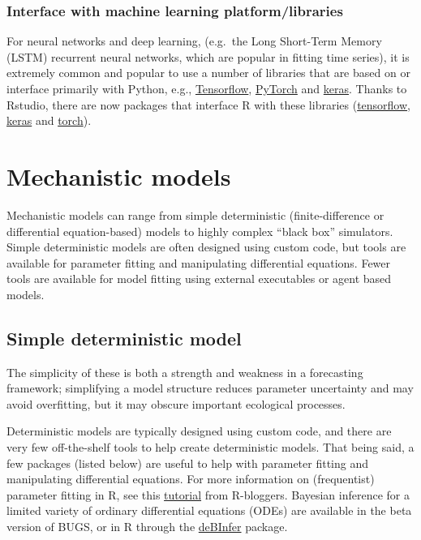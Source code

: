 \documentclass[
]{book}
\begin{document}
\hypertarget{interface-with-machine-learning-platformlibraries}{%
\subsubsection{Interface with machine learning platform/libraries}\label{interface-with-machine-learning-platformlibraries}}

For neural networks and deep learning, (e.g.~the Long Short-Term Memory (LSTM) recurrent neural networks, which are popular in fitting time series), it is extremely common and popular to use a number of libraries that are based on or interface primarily with Python, e.g., \href{https://www.tensorflow.org/}{Tensorflow}, \href{https://pytorch.org/}{PyTorch} and \href{https://keras.io/}{keras}. Thanks to Rstudio, there are now packages that interface R with these libraries (\href{https://tensorflow.rstudio.com/}{tensorflow}, \href{https://keras.rstudio.com/}{keras} and \href{https://blogs.rstudio.com/ai/posts/2020-09-29-introducing-torch-for-r/}{torch}).

\hypertarget{mechanistic-models}{%
\section{Mechanistic models}\label{mechanistic-models}}

Mechanistic models can range from simple deterministic (finite-difference or differential equation-based) models to highly complex ``black box'' simulators. Simple deterministic models are often designed using custom code, but tools are available for parameter fitting and manipulating differential equations. Fewer tools are available for model fitting using external executables or agent based models.

\hypertarget{simple-deterministic-model}{%
\subsection{Simple deterministic model}\label{simple-deterministic-model}}

The simplicity of these is both a strength and weakness in a forecasting framework; simplifying a model structure reduces parameter uncertainty and may avoid overfitting, but it may obscure important ecological processes.

Deterministic models are typically designed using custom code, and there are very few off-the-shelf tools to help create deterministic models. That being said, a few packages (listed below) are useful to help with parameter fitting and manipulating differential equations. For more information on (frequentist) parameter fitting in R, see this \href{https://www.r-bloggers.com/learning-r-parameter-fitting-for-models-involving-differential-equations/}{tutorial} from R-bloggers. Bayesian inference for a limited variety of ordinary differential equations (ODEs) are available in the beta version of BUGS, or in R through the \href{https://cran.r-project.org/web/packages/deBInfer/index.html}{deBInfer} package.
\end{document}
